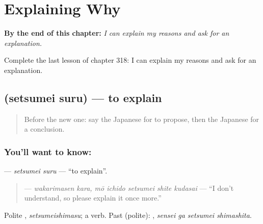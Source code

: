 
\chapter{Explaining Why}
\label{ch:ja-explaining-why}

\begin{chapteropening}
\textbf{By the end of this chapter:} \emph{I can explain my reasons and ask for an explanation.}

Complete the last lesson of chapter 318: I can explain my reasons and ask for an explanation.
\end{chapteropening}

\section[\texorpdfstring{\ja{せつめいする} (setsumei suru)}{せつめいする (setsumei suru)}]{ (setsumei suru) — to explain}

\label{lesson:JA-C318-setsumei-suru}



\begin{quote}
Before the new one: say the Japanese for to propose, then the Japanese for a conclusion.
\end{quote}

\subsection*{You'll want to know: }
\textbf{} — \emph{setsumei suru} — \textquotedblleft{}to explain\textquotedblright{}.

\begin{quote}
\textbf{  } — \emph{wakarimasen kara, mō ichido setsumei shite kudasai} — \textquotedblleft{}I don't understand, so please explain it once more.\textquotedblright{}
\end{quote}

Polite \textbf{}, \emph{setsumeishimasu}; a  verb. Past (polite): \textbf{ }, \emph{sensei ga setsumei shimashita}.

